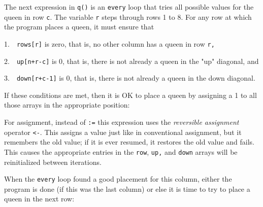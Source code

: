 \bigskip


The next expression in \texttt{q()} is an \texttt{every} loop that tries
all possible values for the queen in row \texttt{c}. The variable
\texttt{r} steps through rows 1 to 8. For any row at which the program
places a queen, it must ensure that

1.\ \ \texttt{rows[r]} is zero, that is, no other column has a queen in
row \texttt{r}\texttt{,}

2.\ \ \texttt{up[n+r-c]} is 0, that is, there is not already a queen in
the "up" diagonal, and

3.\ \ \texttt{down[r+c-1]} is 0, that is, there is not already a queen
in the down diagonal.

If these conditions are met, then it is OK to place a queen by assigning
a 1 to all those arrays in the appropriate position:


For assignment, instead of \texttt{:=} this expression
uses the \textit{reversible assignment}
operator \texttt{{\textless}-}. This assigns a value just like in
conventional assignment, but it remembers the old value; if it is ever
resumed, it restores the old value and fails.
This causes the appropriate entries in the \texttt{row},
\texttt{up}\texttt{,} and \texttt{down} arrays will be reinitialized
between iterations.

When the \texttt{every} loop found a good placement for this column,
either the program is done (if this was the last column) or else it is
time to try to place a queen in the next row:


